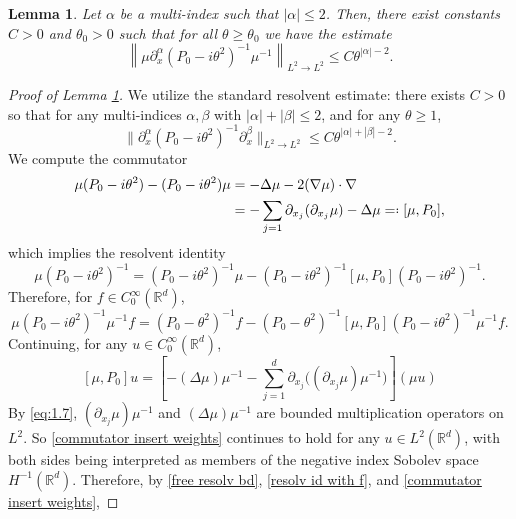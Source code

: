 \documentclass[10pt,a4paper]{amsart}
\newtheorem{lemma}{Lemma}
\def\R{{\mathbb R}}
\newcommand*{\qefed}{=\mathrel{\vcenter{\baselineskip0.5ex \lineskiplimit0pt

                     \hbox{\scriptsize.}\hbox{\scriptsize.}}}%
                     }
\begin{document}
 \begin{lemma} \label{2.2} 
Let $\alpha$ be a multi-index such that $|\alpha|\le 2$. 
 Then, there exist constants $C > 0$ and $\theta_0 > 0$ such that for all $\theta \ge \theta_0$ we have the estimate
\begin{equation}\label{eq:2.11}
\left\|\mu\partial_x^\alpha\left(P_0-i\theta^2\right)^{-1}\mu^{-1}
\right\|_{L^2\to L^2}\le C \theta^{|\alpha|-2}.
\end{equation}
\end{lemma}

 \begin{proof}[Proof of Lemma \ref{2.2}] 
We utilize the standard resolvent estimate: there exists $C > 0$ so that for any multi-indices $\alpha, \beta$ with $|\alpha| + |\beta| \le 2$, and for any $\theta \ge 1$, 
\begin{equation} \label{free resolv bd}
\| \partial_x^\alpha (P_0 - i\theta^2)^{-1} \partial_x^\beta \|_{L^2 \to L^2} \le C \theta^{|\alpha| + |\beta| - 2}.
\end{equation}
 We compute the commutator
\begin{equation*}
\begin{split}
\mu(P_0 - i \theta^2) - (P_0 - i\theta^2) \mu &= - \Delta \mu -2 (\nabla \mu) \cdot \nabla  \\
&=- \sum_{j =1} \partial_{x_j} (\partial_{x_j} \mu) - \Delta \mu \qefed [ \mu, P_0],
\end{split}
\end{equation*}
which implies the resolvent identity
\begin{equation*}
\mu (P_0 - i\theta^2)^{-1} = (P_0 - i \theta^2)^{-1}  \mu -  (P_0 - i \theta^2)^{-1}  [ \mu, P_0]  (P_0 - i \theta^2)^{-1} .
\end{equation*}
Therefore, for $f \in C_0^\infty(\R^d)$, 
\begin{equation} \label{resolv id with f}
\mu(P_0 - i \theta^2)^{-1} \mu^{-1} f = (P_0 - \theta^2)^{-1} f -  (P_0 - \theta^2)^{-1} [\mu, P_0] (P_0 - i\theta^2)^{-1} \mu^{-1} f.
\end{equation}
Continuing, for any $u \in C_0^\infty(\R^d)$, 
\begin{equation} \label{commutator insert weights}
[\mu, P_0] u = \left[ -(\Delta \mu) \mu^{-1} - \sum_{j=1}^d \partial_{x_j} \big((\partial_{x_j} \mu) \mu^{-1} \big)  \right] (\mu u)
\end{equation}
By \eqref{eq:1.7}, $(\partial_{x_j} \mu)\mu^{-1}$ and $(\Delta \mu) \mu^{-1}$ are bounded multiplication operators on $L^2$. So \eqref{commutator insert weights} continues to hold for any $u \in L^2(\R^d)$, with both sides being interpreted as members of the negative index Sobolev space $H^{-1}(\R^d)$. Therefore, by \eqref{free resolv bd}, \eqref{resolv id with f}, and \eqref{commutator insert weights}, 


\end{proof}
\end{document}
